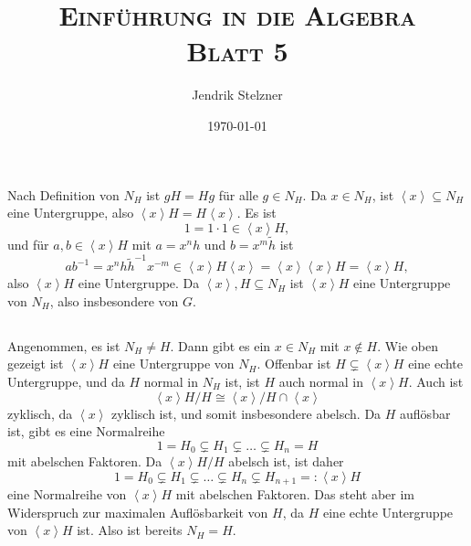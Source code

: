 \documentclass[a4paper,10pt]{article}
\title{\textsc{Einführung in die Algebra \\ \Large Blatt 5}}
\author{Jendrik Stelzner}
\date{\today}
\theoremstyle{definition}
\newcommand{\gen}[1]{\left\langle#1\right\rangle}
\begin{document}
\maketitle





\section{}


\subsection{}
Nach Definition von $N_H$ ist $gH = Hg$ für alle $g \in N_H$. Da $x \in N_H$, ist $\gen{x} \subseteq N_H$ eine Untergruppe, also $\gen{x}H = H\gen{x}$.
Es ist
\[
 1 = 1 \cdot 1 \in \gen{x}H,
\]
und für $a,b \in \gen{x}H$ mit $a = x^n h$ und $b = x^m \tilde{h}$ ist
\[
 ab^{-1} = x^n h \tilde{h}^{-1} x^{-m} \in \gen{x} H \gen{x} = \gen{x} \gen{x} H = \gen{x} H,
\]
also $\gen{x}H$ eine Untergruppe. Da $\gen{x}, H \subseteq N_H$ ist $\gen{x}H$ eine Untergruppe von $N_H$, also insbesondere von $G$.


\subsection{}
Angenommen, es ist $N_H \neq H$. Dann gibt es ein $x \in N_H$ mit $x \not\in H$. Wie oben gezeigt ist $\gen{x}H$ eine Untergruppe von $N_H$. Offenbar ist $H \subsetneq \gen{x}H$ eine echte Untergruppe, und da $H$ normal in $N_H$ ist, ist $H$ auch normal in $\gen{x}H$. Auch ist
\[
 \gen{x}\!H/H \cong \gen{x}/H \cap \gen{x}
\]
zyklisch, da $\gen{x}$ zyklisch ist, und somit insbesondere abelsch. Da $H$ auflösbar ist, gibt es eine Normalreihe
\[
 1 = H_0 \subsetneq H_1 \subsetneq \ldots \subsetneq H_n = H
\]
mit abelschen Faktoren. Da $\gen{x}H/H$ abelsch ist, ist daher
\[
 1 = H_0 \subsetneq H_1 \subsetneq \ldots \subsetneq H_n \subsetneq H_{n+1} =: \gen{x}H
\]
eine Normalreihe von $\gen{x}H$ mit abelschen Faktoren. Das steht aber im Widerspruch zur maximalen Auflösbarkeit von $H$, da $H$ eine echte Untergruppe von $\gen{x}H$ ist. Also ist bereits $N_H = H$.


\section{}

\subsection{}
\end{document}
